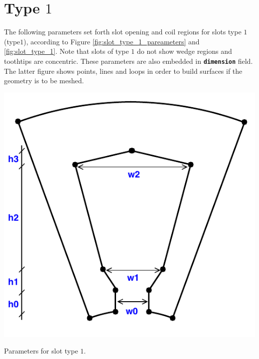 \documentclass{tufte-book} %
\begin{document}
\section[Type 1]{Type $1$}
The following parameters set forth slot opening and coil regions for slots type $1$ (type$1$), according to Figure \ref{fig:slot_type_1_pareameters} and \ref{fig:slot_type_1}. Note that slots of type $1$ do not show wedge regions and toothtips are concentric.  These parameters are also embedded in \texttt{\textbf{dimension}} field.  The latter figure shows points, lines and loops in order to build surfaces if the geometry is to be meshed. 

\begin{marginfigure}
\includegraphics[width=\linewidth]{Slot_Type_0_parameters.pdf}
\caption{Parameters for slot type $1$.}
\label{fig:slot_type_1_pareameters}
\end{marginfigure}
\end{document}
